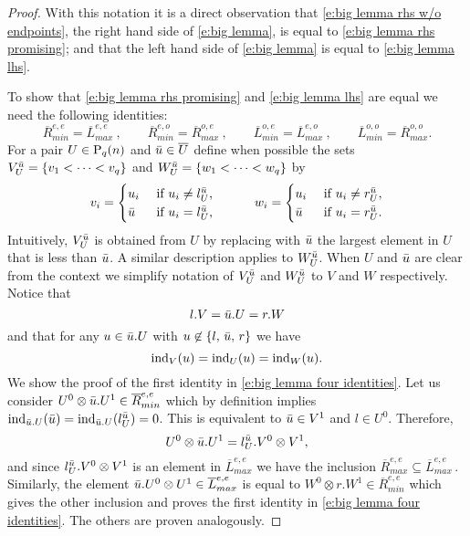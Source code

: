 \begin{proof}
	

	With this notation it is a direct observation that \eqref{e:big lemma rhs w/o endpoints}, the right hand side of \eqref{e:big lemma}, is equal to \eqref{e:big lemma rhs promising}; and that the left hand side of \eqref{e:big lemma} is equal to \eqref{e:big lemma lhs}.
	
	To show that \eqref{e:big lemma rhs promising} and \eqref{e:big lemma lhs} are equal we need the following identities:
	\begin{equation} \label{e:big lemma four identities}
	\overline{R}_{min}^{e,e} = \overline{L}_{max}^{e,e}\ , \qquad
	\overline{R}_{min}^{e,o} = \overline{R}_{max}^{o,e}\ , \qquad 
	\overline{L}_{min}^{o,e} = \overline{L}_{max}^{e,o}\ , \qquad
	\overline{L}_{min}^{o,o} = \overline{R}_{max}^{o,o}.
	\end{equation}
	For a pair $U \in \P_q(n)$ and $\bu \in \overline{U}$ define when possible the sets $V^\bu_U = \{v_1 < \cdots < v_q\}$ and $W_U^\bu = \{w_1 < \cdots < w_q\}$ by
	\begin{align*}
	v_i = 
	\begin{cases}
	u_i & \text{ if } u_i \neq l_U^\bu, \\
	\bu	& \text{ if } u_i = l_U^\bu,
	\end{cases}
	\qquad \quad
	w_i = 
	\begin{cases}
	u_i & \text{ if } u_i \neq r_U^\bu, \\
	\bu	& \text{ if } u_i = r_U^\bu.
	\end{cases}
	\end{align*}
	Intuitively, $V_U^\bu$ is obtained from $U$ by replacing with $\bu$ the largest element in $U$ that is less than $\bu$.
	A similar description applies to $W_U^\bu$.
	When $U$ and $\bu$ are clear from the context we simplify notation of $V^\bu_U$ and $W^\bu_U$ to $V$ and $W$ respectively.
	Notice that
	\begin{equation*}
	l.V = \bu.U = r.W
	\end{equation*}
	and that for any $u \in \bu.U$ with $u \not \in \{l,\, \bu,\, r\}$ we have
	\begin{equation*}
	\ind_{V}(u) = \ind_{U}(u) = \ind_{W}(u).
	\end{equation*}
	We show the proof of the first identity in \eqref{e:big lemma four identities}.
	Let us consider $U^0 \otimes \bu.U^1 \in \overline{R}_{min}^{e, e}$ which by definition implies $\ind_{\bu.U}(\bu) = \ind_{\bu.U}(l_{U}^\bu) = 0$.
	This is equivalent to $\bu \in V^1$ and $l \in U^0$.
	Therefore, 
	\begin{equation*}
	U^0 \otimes \bu.U^1 =  l_{U}^\bu.V^0 \otimes V^1,
	\end{equation*}
	and since $l_{U}^\bu.V^0 \otimes V^1$ is an element in $\overline{L}_{max}^{e,e}$ we have the inclusion $\overline{R}_{max}^{e,e} \subseteq \overline{L}_{max}^{e,e}$\,.
	Similarly, the element $\bu.U^0 \otimes U^1 \in \overline{L}_{max}^{e,e}$ is equal to $W^0 \otimes r.W^1 \in \overline{R}_{min}^{e,e}$ which gives the other inclusion and proves the first identity in \eqref{e:big lemma four identities}.
	The others are proven analogously.
	

\end{proof}
